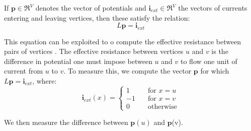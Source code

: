 If $\textbf{p} \in \Re^{V}$ denotes the vector of potentials and 
$\textbf{i}_{ext} \in \Re^{V}$ the vectors of currents entering and leaving 
vertices, then these satisfy the relation:
\begin{equation}
L\textbf{p} = \textbf{i}_{ext}
\end{equation}

This equation can be exploited to o compute the effective resistance between 
pairs of vertices \cite{Spielman:2010}. The effective resistance between 
vertices $u$ and $v$ is the difference in potential one must impose between $u$ 
and $v$ to flow one unit of current from $u$ to $v$. To measure this, we compute
the vector $\textbf{p}$ for which $L\textbf{p} = \textbf{i}_{ext}$, where:
\begin{equation}
\textbf{i}_{ext}(x) =
	\left\{
        \begin{array}{ll}
            1 &   	\quad \text{for $x=u$} \\
            -1 & 	\quad \text{for $x=v$} \\
            0 &		\quad \text{otherwise}
        \end{array}
    \right.
\end{equation}

We then measure the difference between $\textbf{p}(u)$ and $\textbf{p}$(v).
